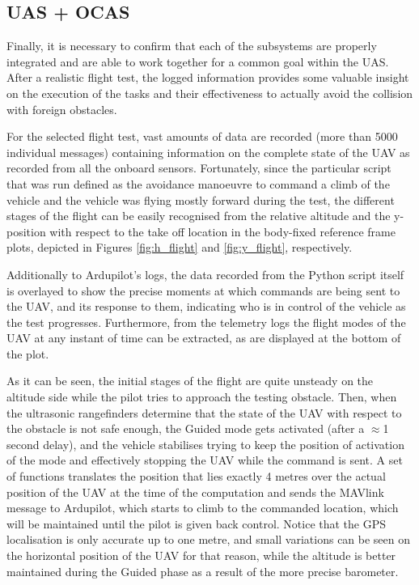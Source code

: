 \subsection{UAS + OCAS}

Finally, it is necessary to confirm that each of the subsystems are properly integrated and are able to work together for a common goal within the UAS.
After a realistic flight test, the logged information provides some valuable insight on the execution of the tasks and their effectiveness to actually avoid the collision with foreign obstacles.

For the selected flight test, vast amounts of data are recorded (more than 5000 individual messages) containing information on the complete state of the UAV as recorded from all the onboard sensors.
Fortunately, since the particular script that was run defined as the avoidance manoeuvre to command a climb of the vehicle and the vehicle was flying mostly forward during the test, the different stages of the flight can be easily recognised from the relative altitude and the y-position with respect to the take off location in the body-fixed reference frame plots, depicted in Figures \ref{fig:h_flight} and \ref{fig:y_flight}, respectively.

Additionally to Ardupilot's logs, the data recorded from the Python script itself is overlayed to show the precise moments at which commands are being sent to the UAV, and its response to them, indicating who is in control of the vehicle as the test progresses.
Furthermore, from the telemetry logs the flight modes of the UAV at any instant of time can be extracted, as are displayed at the bottom of the plot.



As it can be seen, the initial stages of the flight are quite unsteady on the altitude side while the pilot tries to approach the testing obstacle.
Then, when the ultrasonic rangefinders determine that the state of the UAV with respect to the obstacle is not safe enough, the Guided mode gets activated (after a $\approx$1 second delay), and the vehicle stabilises trying to keep the position of activation of the mode and effectively stopping the UAV while the command is sent.
A set of functions translates the position that lies exactly 4 metres over the actual position of the UAV at the time of the computation and sends the MAVlink message to Ardupilot, which starts to climb to the commanded location, which will be maintained until the pilot is given back control.
Notice that the GPS localisation is only accurate up to one metre, and small variations can be seen on the horizontal position of the UAV for that reason, while the altitude is better maintained during the Guided phase as a result of the more precise barometer.

